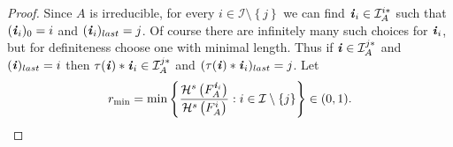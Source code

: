 \documentclass[11pt,english,british]{article}
\numberwithin{equation}{section}
\begin{document}
\begin{proof}
Since $A$ is irreducible, for every $i\in\mathcal{I}\setminus\left\{ j\right\} $
we can find $\textbf{\emph{i}}_{i}\in\mathcal{I}_{A}^{i*}$ such
that $(\textbf{\emph{i}}_{i})_{0}=i$ and $(\textbf{\emph{i}}_{i})_{last}=j$.  Of course there are infinitely many such choices for $\textbf{\emph{i}}_{i}$, but for definiteness choose one with minimal length.
Thus if $\textbf{\emph{i}}\in\mathcal{I}_{A}^{j*}$ and $(\textbf{\emph{i}})_{last}=i$
then $\tau(\textbf{\emph{i}})*\textbf{\emph{i}}_{i}\in\mathcal{I}_{A}^{j*}$
and $(\tau(\textbf{\emph{i}})*\textbf{\emph{i}}_{i})_{last}=j$.
\foreignlanguage{english}{Let
\begin{equation}
r_{\mathrm{\mathrm{min}}}=\min\left\{ \frac{\mathcal{H}^{s}\left(F_{A}^{\textbf{\emph{i}}_{i}}\right)}{\mathcal{H}^{s}\left(F_{A}^{i}\right)}:i\in\mathcal{I}\setminus\left\{ j\right\} \right\} \in(0,1).\label{eq:r_min}
\end{equation}
}


\end{proof}
\end{document}
